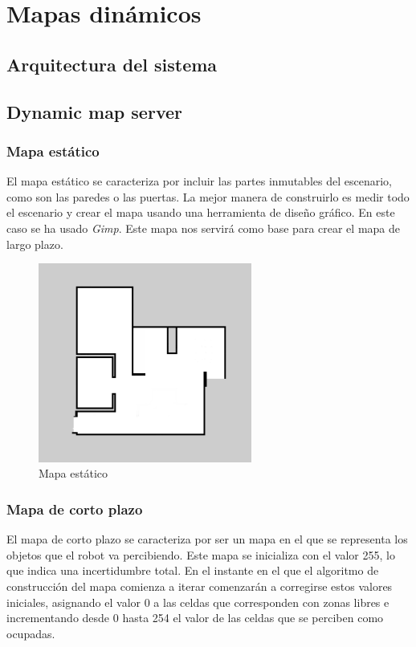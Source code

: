 \chapter{Mapas dinámicos}
\label{cap:mapasdinamicos}
\section{Arquitectura del sistema}
\label{cap:arquitecturadelsistema}



\section{Dynamic map server}
\label{cap:sevidordemapasdinamico}




\subsection{Mapa estático}
El mapa estático se caracteriza por incluir las partes inmutables del escenario, como son las paredes o las puertas. La mejor manera de construirlo es medir todo el escenario y crear el mapa usando una herramienta de diseño gráfico. En este caso se ha usado \textit{Gimp}.
Este mapa nos servirá como base para crear el mapa de largo plazo.

\begin{figure} [hbtp]
  \begin{center}
    \includegraphics[width=7cm]{img/cap5/mapaestatico}
  \end{center}
  \caption{Mapa estático}
  \label{fig:mapaestatico}
\end{figure}

\subsection{Mapa de corto plazo}
El mapa de corto plazo se caracteriza por ser un mapa en el que se representa los objetos que el robot va percibiendo. Este mapa se inicializa con el valor 255, lo que indica una incertidumbre total. En el instante en el que el algoritmo de construcción del mapa comienza a iterar comenzarán a corregirse estos valores iniciales, asignando el valor 0 a las celdas que corresponden con zonas libres e incrementando desde 0 hasta 254 el valor de las celdas que se perciben como ocupadas. \pagebreak

